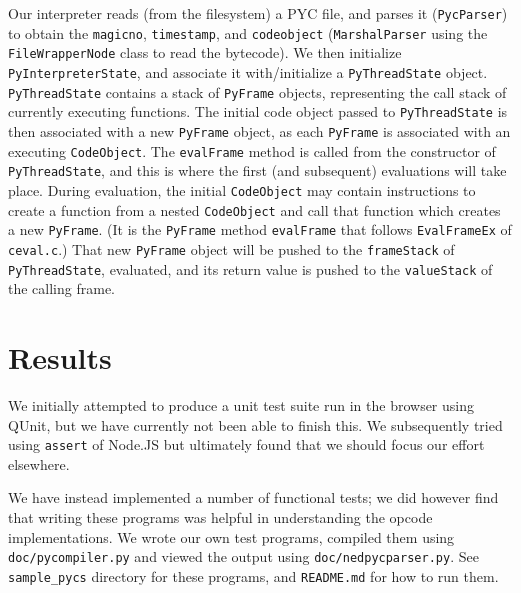 \documentclass{article}
\begin{document}
Our interpreter reads (from the filesystem) a PYC file, and parses it (\texttt{PycParser}) to obtain the \texttt{magicno}, \texttt{timestamp}, and \texttt{codeobject} (\texttt{MarshalParser} using the \texttt{FileWrapperNode} class to read the bytecode). We then initialize \texttt{PyInterpreterState}, and associate it with/initialize a \texttt{PyThreadState} object. \texttt{PyThreadState}
contains a stack of \texttt{PyFrame} objects, representing the call stack of currently executing functions. The initial code object passed to \texttt{PyThreadState} is then associated with a new \texttt{PyFrame} object, as each \texttt{PyFrame} is associated with an executing \texttt{CodeObject}. The \texttt{evalFrame} method is called from the constructor of \texttt{PyThreadState}, and this is where the first (and subsequent) evaluations will take place.
During evaluation, the initial \texttt{CodeObject} may contain instructions to create a function from a nested \texttt{CodeObject} and call that function which creates a new \texttt{PyFrame}. 
(It is the \texttt{PyFrame} method \texttt{evalFrame} that follows \texttt{EvalFrameEx} of \texttt{ceval.c}.)
That new \texttt{PyFrame} object will be pushed to the \texttt{frameStack} of \texttt{PyThreadState}, evaluated, and its return value is pushed to the \texttt{valueStack} of the calling frame.

\section*{Results}

We initially attempted to produce a unit test suite run in the browser using QUnit, but we have currently not been able to finish this. We subsequently tried using \texttt{assert} of Node.JS but ultimately found that we should focus our effort elsewhere.

We have instead implemented a number of functional tests; we did however find that writing these programs was helpful in understanding the opcode implementations. We wrote our own test programs, compiled them using \texttt{doc/pycompiler.py} and viewed the output using \texttt{doc/nedpycparser.py}. See \texttt{sample\_pycs} directory for these programs, and \texttt{README.md} for how to run them.
\end{document}
